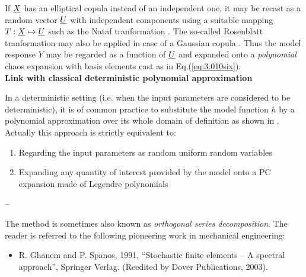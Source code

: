 {  If ${\underline{X}}$ has an elliptical copula instead of an independent one, it may be recast as a random vector ${\underline{U}}$ with independent components using a suitable mapping $T : {\underline{X}} \mapsto {\underline{U}}$ such as the Nataf tranformation . The so-called Rosenblatt tranformation may also be applied in case of a Gaussian copula . Thus the model response $Y$ may be regarded as a function of ${\underline{U}}$ and expanded onto a \emph{polynomial} chaos expansion with basis elements cast as in Eq.(\ref{eq:3.010six}). \\

  \textbf{Link with classical deterministic polynomial approximation} \vspace{2mm}

  In a deterministic setting (i.e. when the input parameters are considered to be deterministic), it is of common practice to substitute the model function $h$ by a polynomial approximation over its whole domain of definition as shown in . Actually this approach is strictly equivalent to:
  \begin{enumerate}
  \item Regarding the input parameters as random uniform random variables
  \item Expanding any quantity of interest provided by the model onto a PC expansion made of Legendre polynomials
  \end{enumerate}

}

{
  --
}

            {
              The method is sometimes also known as \emph{orthogonal series decomposition}. The reader is referred to the following pioneering work in mechanical engineering:
              \begin{itemize}
              \item R. Ghanem and P. Spanos, 1991, ``Stochastic finite elements -- A spectral approach'', Springer Verlag. (Reedited by Dover Publications, 2003).
              \end{itemize}
            }

